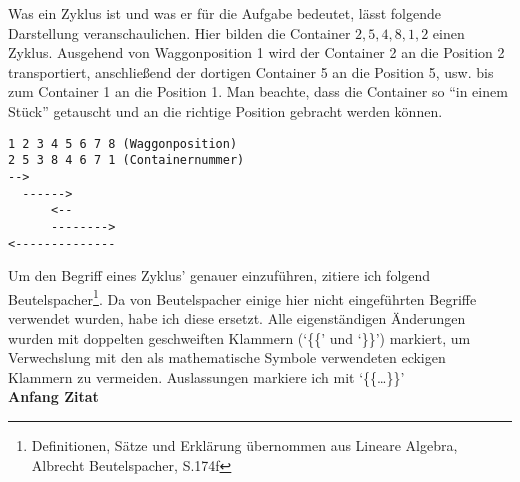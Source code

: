 Was ein Zyklus ist und was er für die Aufgabe bedeutet, lässt folgende Darstellung veranschaulichen.
Hier bilden die Container $2,5,4,8,1,2$ einen Zyklus. Ausgehend von Waggonposition 1 wird der Container 2 an die Position 2 transportiert,
anschließend der dortigen Container 5 an die Position 5, usw. bis zum Container 1 an die Position 1.
Man beachte, dass die Container so ``in einem Stück'' getauscht und an die richtige Position gebracht werden können.
\lstset{basicstyle=\ttfamily}
\begin{lstlisting}
1 2 3 4 5 6 7 8 (Waggonposition)
2 5 3 8 4 6 7 1 (Containernummer)
-->
  ------>
      <--
      -------->
<--------------
\end{lstlisting}
\lstset{basicstyle=\ttfamily}
Um den Begriff eines Zyklus' genauer einzuführen, zitiere ich folgend Beutelspacher\footnote{Definitionen, Sätze und Erklärung übernommen aus Lineare Algebra, Albrecht Beutelspacher, S.174f}.
Da von Beutelspacher einige hier nicht eingeführten Begriffe verwendet wurden, habe ich diese ersetzt.
Alle eigenständigen Änderungen wurden mit doppelten geschweiften Klammern (`\{\{' und `\}\}') markiert, um Verwechslung mit den als mathematische Symbole verwendeten eckigen Klammern zu vermeiden.
Auslassungen markiere ich mit `\{\{\dots\}\}'  \\
\textbf{Anfang Zitat}

